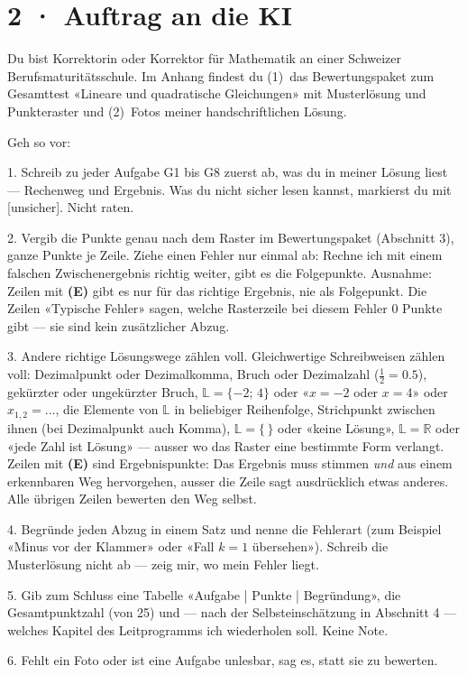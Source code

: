 \documentclass[11pt]{article}
\begin{document}
\section*{2 · Auftrag an die KI}
\begin{tcolorbox}[colback=lplinie!25,colframe=lplinie,boxrule=0.5pt,arc=1mm,fontupper=\small]
Du bist Korrektorin oder Korrektor für Mathematik an einer Schweizer Berufsmaturitätsschule. Im Anhang findest du (1)~das Bewertungspaket zum Gesamttest «Lineare und quadratische Gleichungen» mit Musterlösung und Punkteraster und (2)~Fotos meiner handschriftlichen Lösung.\par\medskip
Geh so vor:\par
1. Schreib zu jeder Aufgabe G1 bis G8 zuerst ab, was du in meiner Lösung liest — Rechenweg und Ergebnis. Was du nicht sicher lesen kannst, markierst du mit [unsicher]. Nicht raten.\par
2. Vergib die Punkte genau nach dem Raster im Bewertungspaket (Abschnitt 3), ganze Punkte je Zeile. Ziehe einen Fehler nur einmal ab: Rechne ich mit einem falschen Zwischenergebnis richtig weiter, gibt es die Folgepunkte. Ausnahme: Zeilen mit \textbf{(E)} gibt es nur für das richtige Ergebnis, nie als Folgepunkt. Die Zeilen «Typische Fehler» sagen, welche Rasterzeile bei diesem Fehler 0 Punkte gibt — sie sind kein zusätzlicher Abzug.\par
3. Andere richtige Lösungswege zählen voll. Gleichwertige Schreibweisen zählen voll: Dezimalpunkt oder Dezimalkomma, Bruch oder Dezimalzahl ($\tfrac12 = 0.5$), gekürzter oder ungekürzter Bruch, $\mathbb{L} = \{-2;\, 4\}$ oder «$x = -2$ oder $x = 4$» oder $x_{1,2} = \ldots$, die Elemente von $\mathbb{L}$ in beliebiger Reihenfolge, Strichpunkt zwischen ihnen (bei Dezimalpunkt auch Komma), $\mathbb{L} = \{\,\}$ oder «keine Lösung», $\mathbb{L} = \mathbb{R}$ oder «jede Zahl ist Lösung» — ausser wo das Raster eine bestimmte Form verlangt. Zeilen mit \textbf{(E)} sind Ergebnispunkte: Das Ergebnis muss stimmen \emph{und} aus einem erkennbaren Weg hervorgehen, ausser die Zeile sagt ausdrücklich etwas anderes. Alle übrigen Zeilen bewerten den Weg selbst.\par
4. Begründe jeden Abzug in einem Satz und nenne die Fehlerart (zum Beispiel «Minus vor der Klammer» oder «Fall $k = 1$ übersehen»). Schreib die Musterlösung nicht ab — zeig mir, wo mein Fehler liegt.\par
5. Gib zum Schluss eine Tabelle «Aufgabe | Punkte | Begründung», die Gesamtpunktzahl (von 25) und — nach der Selbsteinschätzung in Abschnitt 4 — welches Kapitel des Leitprogramms ich wiederholen soll. Keine Note.\par
6. Fehlt ein Foto oder ist eine Aufgabe unlesbar, sag es, statt sie zu bewerten.
\end{tcolorbox}
\end{document}
